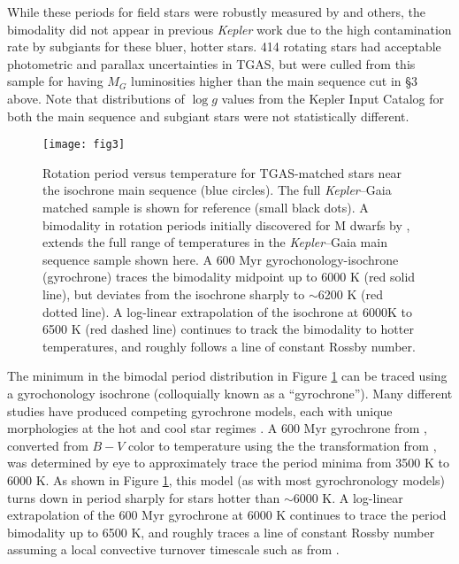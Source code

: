 \documentclass[manuscript, letterpaper]{aastex6}
\newcommand{\Kepler}{\textsl{Kepler}\xspace}
\begin{document}
While these periods for field stars were robustly measured by \citet{mcquillan2014} and others, the bimodality did not appear in previous \Kepler work due to the high contamination rate by subgiants for these bluer, hotter stars.  414 rotating stars had acceptable photometric and parallax uncertainties in TGAS, but were culled from this sample for having $M_G$ luminosities higher than the main sequence cut in \S3 above. Note that distributions of $\log g$ values from the Kepler Input Catalog \citep{brown2011a} for both the main sequence and subgiant stars were not statistically different.


\begin{figure}[]
\centering
\texttt{[image: fig3]}
\caption{ Rotation period versus temperature for TGAS-matched stars near the isochrone main sequence (blue circles). 
The full \Kepler--Gaia matched sample is shown for reference (small black dots). A bimodality in rotation periods initially discovered for M dwarfs by \citet{mcquillan2013}, extends the full range of temperatures in the \Kepler--Gaia main sequence sample shown here.
A \citet{meibom2011} 600 Myr gyrochonology-isochrone (gyrochrone) traces the bimodality midpoint up to 6000 K (red solid line), but deviates from the isochrone sharply to $\sim$6200 K (red dotted line). A log-linear extrapolation of the isochrone at 6000K to 6500 K (red dashed line) continues to track the bimodality to hotter temperatures, and roughly follows a line of constant Rossby number. 
}
\label{fig:gyro}
\end{figure}



The minimum in the bimodal period distribution in Figure \ref{fig:gyro} can be traced using a gyrochonology isochrone (colloquially known as a ``gyrochrone'').  Many different studies have produced competing gyrochrone models, each with unique morphologies at the hot and cool star regimes \citep[e.g.][]{barnes2007,mamajek2008,meibom2011,angus2015}. A 600 Myr gyrochrone from \citet{meibom2011}, converted from $B-V$ color to temperature using the the transformation from \citet{sekiguchi2000}, was determined by eye to approximately trace the period minima from 3500 K to 6000 K. As shown in Figure \ref{fig:gyro}, this model (as with most gyrochronology models) turns down in period sharply for stars hotter than $\sim$6000 K. A log-linear extrapolation of the 600 Myr gyrochrone at 6000 K continues to trace the period bimodality up to 6500 K, and roughly traces a line of constant Rossby number assuming a local convective turnover timescale such as from \citet{barnes_kim2010}. 
\end{document}
